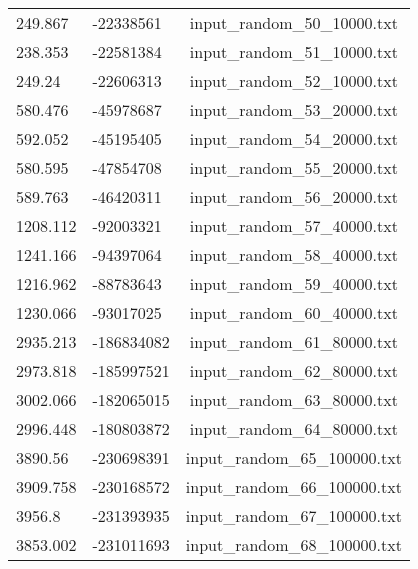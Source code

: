 \begin{longtable}[hb]{|l|l|c|}
    249.867 & -22338561 & input\_random\_50\_10000.txt \\
    238.353 & -22581384 & input\_random\_51\_10000.txt \\
    249.24 & -22606313 & input\_random\_52\_10000.txt \\
    580.476 & -45978687 & input\_random\_53\_20000.txt \\
    592.052 & -45195405 & input\_random\_54\_20000.txt \\
    580.595 & -47854708 & input\_random\_55\_20000.txt \\
    589.763 & -46420311 & input\_random\_56\_20000.txt \\
    1208.112 & -92003321 & input\_random\_57\_40000.txt \\
    1241.166 & -94397064 & input\_random\_58\_40000.txt \\
    1216.962 & -88783643 & input\_random\_59\_40000.txt \\
    1230.066 & -93017025 & input\_random\_60\_40000.txt \\
    2935.213 & -186834082 & input\_random\_61\_80000.txt \\
    2973.818 & -185997521 & input\_random\_62\_80000.txt \\
    3002.066 & -182065015 & input\_random\_63\_80000.txt \\
    2996.448 & -180803872 & input\_random\_64\_80000.txt \\
    3890.56 & -230698391 & input\_random\_65\_100000.txt \\
    3909.758 & -230168572 & input\_random\_66\_100000.txt \\
    3956.8 & -231393935 & input\_random\_67\_100000.txt \\
    3853.002 & -231011693 & input\_random\_68\_100000.txt \\
    \hline
\end{longtable}
